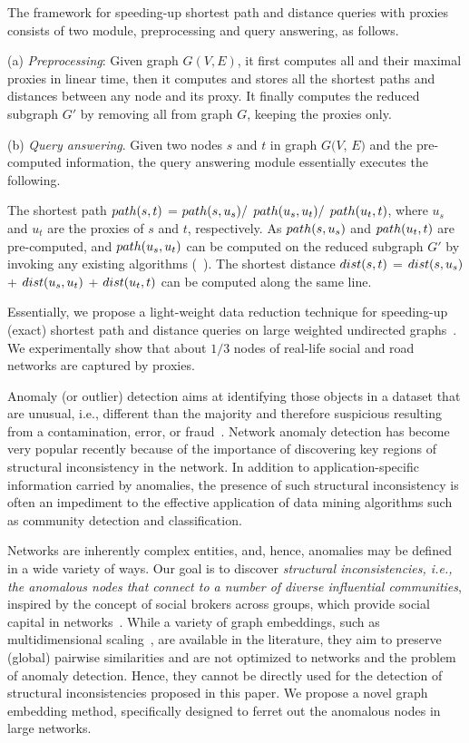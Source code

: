 The framework for speeding-up shortest path and distance queries with proxies consists of two module, preprocessing and query answering, as follows.


\ni(a) {\em Preprocessing}: Given graph $G(V, E)$, it first computes all \dras and their maximal proxies in linear time, then it computes and stores all the shortest paths and distances between any node and its proxy. It finally computes the reduced subgraph $G'$ by removing all \dras from graph $G$, \ie keeping the proxies only.


\ni(b) {\em Query answering}. Given two nodes $s$ and $t$ in graph $G(V$, $E)$  and the pre-computed information, the query answering module essentially executes the following.

The shortest path $\path(s, t)$ = $\path(s, u_s)/$ $\path(u_s, u_t)/$ $\path(u_t, t)$, where $u_s$ and $u_t$ are the proxies of $s$ and $t$, respectively.
As  $\path(s, u_s)$ and $\path(u_t, t)$ are pre-computed, and $\path(u_s, u_t)$ can be computed on the reduced subgraph $G'$ by invoking any existing algorithms
(\eg \ah~\cite{zhu2013shortest}).
%
The shortest distance $\dist(s, t)$ = $\dist(s, u_s)$ + $\dist(u_s, u_t)$ + $\dist(u_t, t)$ can be computed along the same line.

Essentially, we propose a light-weight data reduction technique for speeding-up (exact)  shortest path and distance queries on large weighted undirected graphs~\cite{MaFLWCH16}. We experimentally show that about $1/3$  nodes of real-life social and road networks  are captured by proxies.





Anomaly (or outlier) detection aims at identifying those objects in a dataset that are unusual, i.e., different than the majority and therefore suspicious resulting from a contamination, error, or fraud~\cite{Zimek2017}. Network anomaly detection has become very popular
recently because of the importance of discovering key
regions of structural inconsistency in the network. In addition
to application-specific information carried by anomalies, the
presence of such structural inconsistency is often an impediment
to the effective application of data mining algorithms such as
community detection and classification.


Networks are inherently complex entities, and, hence, anomalies may be defined in a wide variety of ways.
Our goal is to discover {\em  structural inconsistencies, i.e.,  the anomalous nodes that connect to a number of diverse influential communities}, inspired by the concept of social brokers across groups, which provide social capital in networks~\cite{s-hole04}.
While a variety of graph embeddings, such as multidimensional scaling~\cite{mds}, are available in the literature, they aim to preserve (global) pairwise similarities and are not optimized to networks and the problem of anomaly detection.
Hence, they cannot be directly used for the detection of structural inconsistencies proposed in this paper. We propose a novel graph embedding method, specifically designed to ferret out the anomalous nodes in large networks.



